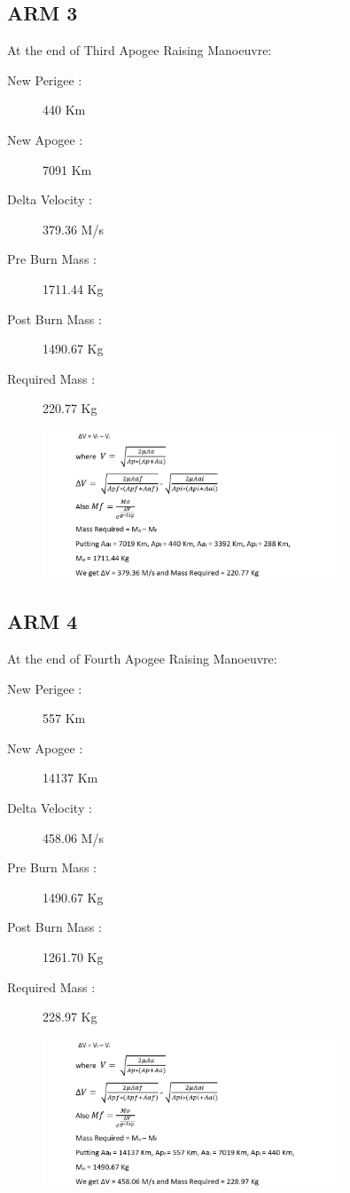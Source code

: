 \documentclass[11pt,fleqn]{book} %
\begin{document}
\subsection{ARM 3}

At the end of Third Apogee Raising Manoeuvre:
\begin{description}
\item[New Perigee :] 440 Km
\item[New Apogee :] 7091 Km
\item[Delta Velocity :] 379.36 M/s
\item[Pre Burn Mass :] 1711.44 Kg
\item[Post Burn Mass :] 1490.67 Kg
\item[Required Mass :] 220.77 Kg
\end{description}

\begin{figure}[h]
    \includegraphics[width=0.8\textwidth]{ARM3.png}
\end{figure}

\subsection{ARM 4}

At the end of Fourth Apogee Raising Manoeuvre:
\begin{description}
\item[New Perigee :] 557 Km
\item[New Apogee :] 14137 Km
\item[Delta Velocity :] 458.06 M/s
\item[Pre Burn Mass :] 1490.67 Kg
\item[Post Burn Mass :] 1261.70 Kg
\item[Required Mass :] 228.97 Kg
\end{description}

\begin{figure}[h]
    \includegraphics[width=0.8\textwidth]{ARM4.png}
\end{figure}
\clearpage
\end{document}
